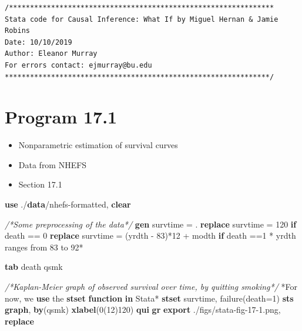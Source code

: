 \documentclass[
  10pt,
]{book}
\newenvironment{Shaded}{\begin{snugshade}}{\end{snugshade}}
\newcommand{\CommentTok}[1]{\textcolor[rgb]{0.56,0.35,0.01}{\textit{#1}}}
\newcommand{\KeywordTok}[1]{\textcolor[rgb]{0.13,0.29,0.53}{\textbf{#1}}}
\newcommand{\NormalTok}[1]{#1}
\providecommand{\tightlist}{%
  \setlength{\itemsep}{0pt}\setlength{\parskip}{0pt}}
\begin{document}
\begin{verbatim}
/***************************************************************
Stata code for Causal Inference: What If by Miguel Hernan & Jamie Robins
Date: 10/10/2019
Author: Eleanor Murray 
For errors contact: ejmurray@bu.edu
***************************************************************/
\end{verbatim}

\hypertarget{program-17.1-1}{%
\section{Program 17.1}\label{program-17.1-1}}

\begin{itemize}
\tightlist
\item
  Nonparametric estimation of survival curves
\item
  Data from NHEFS
\item
  Section 17.1
\end{itemize}

\begin{Shaded}
\begin{Highlighting}[]
\KeywordTok{use}\NormalTok{ ./}\KeywordTok{data}\NormalTok{/nhefs{-}formatted, }\KeywordTok{clear}

\CommentTok{/*Some preprocessing of the data*/}
\KeywordTok{gen}\NormalTok{ survtime = .}
\KeywordTok{replace}\NormalTok{ survtime = 120 }\KeywordTok{if}\NormalTok{ death == 0}
\KeywordTok{replace}\NormalTok{ survtime = (yrdth {-} 83)*12 + modth }\KeywordTok{if}\NormalTok{ death ==1}
\NormalTok{* yrdth ranges from 83 to 92*}

\KeywordTok{tab}\NormalTok{ death qsmk}

\CommentTok{/*Kaplan{-}Meier graph of observed survival over time, by quitting smoking*/}
\NormalTok{*For now, we }\KeywordTok{use}\NormalTok{ the }\KeywordTok{stset} \KeywordTok{function} \KeywordTok{in}\NormalTok{ Stata*}
\KeywordTok{stset}\NormalTok{ survtime, failure(death=1)}
\KeywordTok{sts} \KeywordTok{graph}\NormalTok{, }\KeywordTok{by}\NormalTok{(qsmk) }\KeywordTok{xlabel}\NormalTok{(0(12)120)}
\KeywordTok{qui} \KeywordTok{gr} \KeywordTok{export}\NormalTok{ ./figs/stata{-}fig{-}17{-}1.png, }\KeywordTok{replace}
\end{Highlighting}
\end{Shaded}
\end{document}
